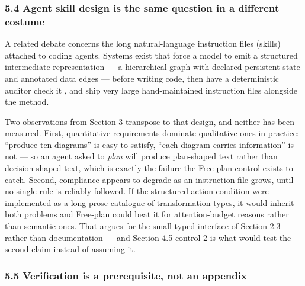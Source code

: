 \documentclass[
  11pt,
]{article}
\begin{document}
\hypertarget{agent-skill-design-is-the-same-question-in-a-different-costume}{%
\subsubsection{5.4 Agent skill design is the same question in a different costume}\label{agent-skill-design-is-the-same-question-in-a-different-costume}}

A related debate concerns the long natural-language instruction files (skills) attached to coding agents. Systems exist that force a model to emit a structured intermediate representation --- a hierarchical graph with declared persistent state and annotated data edges --- before writing code, then have a deterministic auditor check it \cite{flashrt28}, and ship very large hand-maintained instruction files alongside the method.

Two observations from Section 3 transpose to that design, and neither has been measured. First, quantitative requirements dominate qualitative ones in practice: ``produce ten diagrams'' is easy to satisfy, ``each diagram carries information'' is not --- so an agent asked to \emph{plan} will produce plan-shaped text rather than decision-shaped text, which is exactly the failure the Free-plan control exists to catch. Second, compliance appears to degrade as an instruction file grows, until no single rule is reliably followed. If the structured-action condition were implemented as a long prose catalogue of transformation types, it would inherit both problems and Free-plan could beat it for attention-budget reasons rather than semantic ones. That argues for the small typed interface of Section 2.3 rather than documentation --- and Section 4.5 control 2 is what would test the second claim instead of assuming it.

\hypertarget{verification-is-a-prerequisite-not-an-appendix}{%
\subsubsection{5.5 Verification is a prerequisite, not an appendix}\label{verification-is-a-prerequisite-not-an-appendix}}
\end{document}
